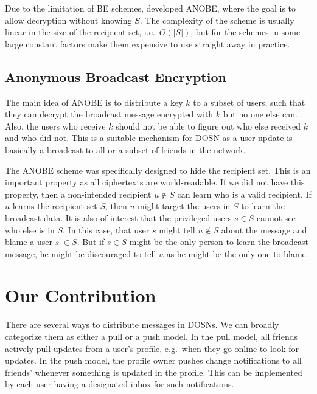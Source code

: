 Due to the limitation of \ac{BE} schemes, \citet{anobe} developed \ac{ANOBE}, 
where the goal is to allow decryption without knowing \(S\).
The complexity of the scheme is usually linear in the size of the recipient 
set, i.e.~\(O(|S|)\), but for the schemes in \cite{anobe} some large constant 
factors make them expensive to use straight away in practice.

\subsection{Anonymous Broadcast Encryption}\label{sec:ANOBE}

The main idea of \ac{ANOBE} is to distribute a key \(k\) to a subset of users, 
such that they can decrypt the broadcast message encrypted with \(k\) but no 
one else can.
Also, the users who receive \(k\) should not be able to figure out who else 
received \(k\) and who did not.
This is a suitable mechanism for \ac{DOSN} as a user update is basically 
a broadcast to all or a subset of friends in the network.

The \ac{ANOBE} scheme was specifically designed to hide the recipient set.
This is an important property as all ciphertexts are world-readable.
If we did not have this property, then a non-intended recipient \(u\notin S\) 
can learn who is a valid recipient.
If \(u\) learns the recipient set \(S\), then \(u\) might target the users in 
\(S\) to learn the broadcast data.
It is also of interest that the privileged users \(s\in S\) cannot see who else 
is in \(S\).
In this case, that user \(s\) might tell \(u\notin S\) about the message and 
blame a user \(s^\prime\in S\).
But if \(s\in S\) might be the only person to learn the broadcast message, he 
might be discouraged to tell \(u\) as he might be the only one to blame.


\section{Our Contribution}\label{sec:Contribution}

There are several ways to distribute messages in \acp{DOSN}.
We can broadly categorize them as either a pull or a push model.
In the pull model, all friends actively pull updates from a user's profile, 
e.g.~when they go online to look for updates.
In the push model, the profile owner pushes change notifications to all 
friends' whenever something is updated in the profile.
This can be implemented by each user having a designated inbox for such 
notifications.


